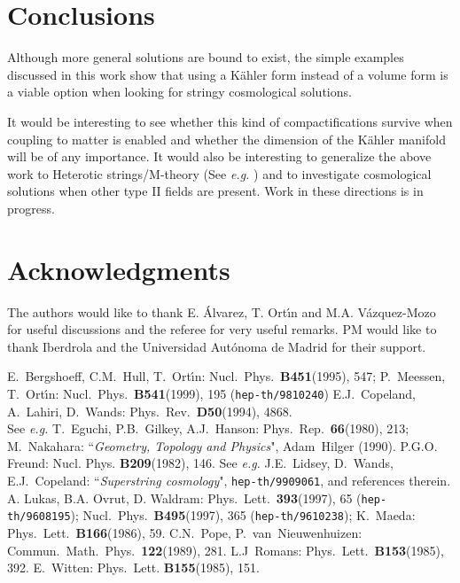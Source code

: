 \documentclass[a4paper,11pt]{article}
\begin{document}
\section{Conclusions}
Although more general solutions are bound to exist,
the simple examples 
discussed in this work show that using a K\"ahler form instead of
a volume form is a viable option when looking for stringy cosmological
solutions.
\par
It would be interesting to see whether this kind of compactifications
survive when coupling to matter is enabled and whether
the dimension of the K\"ahler manifold will be of any importance.
It would also be interesting to generalize the above work to Heterotic
strings/M-theory (See {\em e.g.} \cite{art:Maeda})
and to investigate cosmological
solutions when other type II fields are present. 
Work in these directions is in progress.
\section*{Acknowledgments}
The authors would like to thank E. \'Alvarez, T. Ort\'{\i}n
and M.A. V\'azquez-Mozo for
useful discussions and the referee for very useful remarks.
PM would like to thank Iberdrola and the Universidad
Aut\'onoma de Madrid for their support.
\begin{thebibliography}{1}
%
%
 E.~Bergshoeff, C.M.~Hull, T.~Ort\'{\i}n:
        Nucl.~Phys.~{\bf B451}(1995), 547;
        P.~Meessen, T.~Ort\'{\i}n:
        Nucl.~Phys.~{\bf B541}(1999), 195 ({\tt hep-th/9810240})
%
%
%
 E.J.~Copeland, A.~Lahiri, D.~Wands:
        Phys.~Rev.~{\bf D50}(1994), 4868.\\
%
 See {\em e.g.} T.~Eguchi, P.B.~Gilkey, A.J.~Hanson:
        Phys.~Rep.~{\bf 66}(1980), 213;
        M.~Nakahara:
        ``{\em Geometry, Topology and Physics}",
        Adam~Hilger (1990).
%
%
 P.G.O. Freund:
        Nucl. Phys. {\bf B209}(1982), 146.
%
%
 See {\em e.g.} J.E.~Lidsey, D.~Wands, E.J.~Copeland:
        ``{\em Superstring cosmology}",
        {\tt hep-th/9909061}, and references therein.
%
 A. Lukas, B.A. Ovrut, D. Waldram:
        Phys.~Lett.~{\bf 393}(1997), 65 ({\tt hep-th/9608195});
        Nucl.~Phys.~{\bf B495}(1997), 365 ({\tt hep-th/9610238});
%
 K.~Maeda:
        Phys.~Lett.~{\bf B166}(1986), 59.
%
%
%
 C.N.~Pope, P.~van~Nieuwenhuizen:
       Commun.~Math.~Phys.~{\bf 122}(1989), 281.
%
 L.J~Romans:
        Phys.~Lett.~{\bf B153}(1985), 392.
%
 E.~Witten:
        Phys.~Lett. {\bf B155}(1985), 151.
%
\end{thebibliography}
\end{document}
